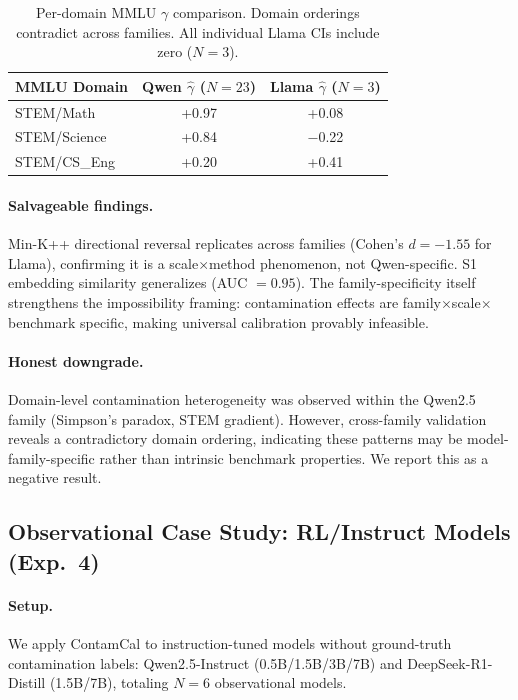 \documentclass[11pt,a4paper]{article}
\newcommand{\gam}{\gamma}
\begin{document}
\begin{table}[t]
\centering
\small
\caption{Per-domain MMLU $\gam$ comparison. Domain orderings contradict across families. All individual Llama CIs include zero ($N = 3$).}
\label{tab:stem_gradient}
\begin{tabular}{lcc}
\toprule
\textbf{MMLU Domain} & Qwen $\hat{\gam}$ ($N{=}23$) & Llama $\hat{\gam}$ ($N{=}3$) \\
\midrule
STEM/Math    & +0.97 & +0.08 \\
STEM/Science & +0.84 & $-$0.22 \\
STEM/CS\_Eng & +0.20 & +0.41 \\
\bottomrule
\end{tabular}
\end{table}

\paragraph{Salvageable findings.}
Min-K++ directional reversal replicates across families (Cohen's $d = -1.55$ for Llama), confirming it is a scale$\times$method phenomenon, not Qwen-specific.
S1 embedding similarity generalizes (AUC $= 0.95$).
The family-specificity itself strengthens the impossibility framing: contamination effects are family$\times$scale$\times$benchmark specific, making universal calibration provably infeasible.

\paragraph{Honest downgrade.}
Domain-level contamination heterogeneity was observed within the Qwen2.5 family (Simpson's paradox, STEM gradient).
However, cross-family validation reveals a contradictory domain ordering, indicating these patterns may be model-family-specific rather than intrinsic benchmark properties.
We report this as a negative result.

\subsection{Observational Case Study: RL/Instruct Models (Exp.~4)}
\label{sec:exp_rl}

\paragraph{Setup.}
We apply ContamCal to instruction-tuned models without ground-truth contamination labels: Qwen2.5-Instruct (0.5B/1.5B/3B/7B) and DeepSeek-R1-Distill (1.5B/7B), totaling $N = 6$ observational models.
\end{document}

